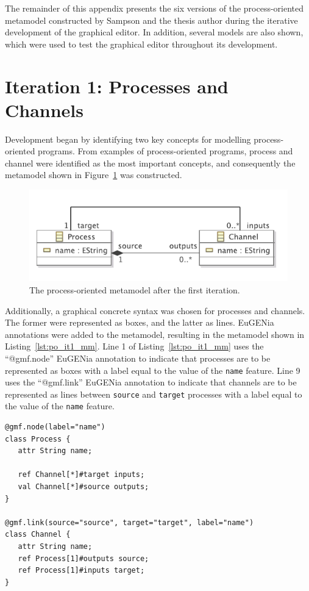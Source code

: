 The remainder of this appendix presents the six versions of the process-oriented metamodel constructed by Sampson and the thesis author during the iterative development of the graphical editor. In addition, several models are also shown, which were used to test the graphical editor throughout its development. 

\section{Iteration 1: Processes and Channels}
Development began by identifying two key concepts for modelling process-oriented programs. From examples of process-oriented programs, process and channel were identified as the most important concepts, and consequently the metamodel shown in Figure~\ref{fig:po_it1_mm} was constructed.


\begin{figure}[htbp]
	\centering
		\includegraphics[scale=0.75]{A.2.ProcessOriented/images/1_mm.pdf}
	\caption{The process-oriented metamodel after the first iteration.}
	\label{fig:po_it1_mm}
\end{figure}

Additionally, a graphical concrete syntax was chosen for processes and channels. The former were represented as boxes, and the latter as lines. EuGENia annotations were added to the metamodel, resulting in the metamodel shown in Listing~\ref{lst:po_it1_mm}. Line 1 of Listing~\ref{lst:po_it1_mm} uses the ``@gmf.node'' EuGENia annotation to indicate that processes are to be represented as boxes with a label equal to the value of the \texttt{name} feature. Line 9 uses the ``@gmf.link'' EuGENia annotation to indicate that channels are to be represented as lines between \texttt{source} and \texttt{target} processes with a label equal to the value of the \texttt{name} feature. 

\begin{lstlisting}[caption=The annotated process-oriented metamodel after the first iteration, label=lst:po_it1_mm, language=Emfatic]
@gmf.node(label="name")
class Process {
   attr String name;
      
   ref Channel[*]#target inputs;
   val Channel[*]#source outputs; 
}

@gmf.link(source="source", target="target", label="name")
class Channel { 
   attr String name;
   ref Process[1]#outputs source;
   ref Process[1]#inputs target;
} 

\end{lstlisting}

